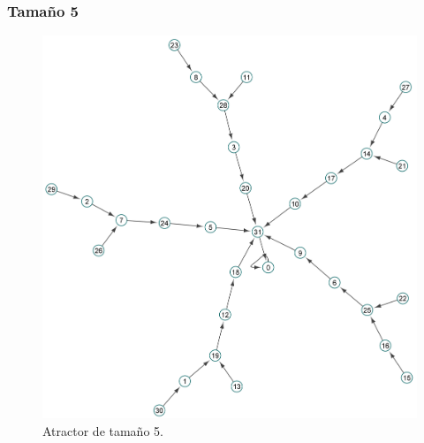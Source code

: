 \documentclass[11pt]{article}
\begin{document}
			\subsubsection{Tamaño 5}
			\begin{figure}[H]
			\centering
			\includegraphics[scale=0.1]{resources/Atractores54/atractor_54_size_5.png}
			\caption{Atractor de tamaño 5.}\label{fig:picture}
			\end{figure}
\end{document}
